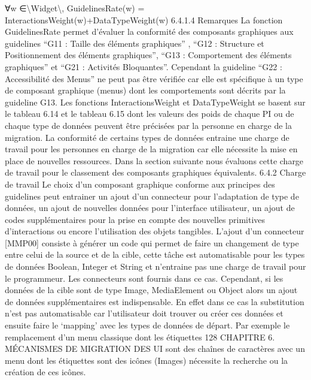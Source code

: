 \documentclass{article}
\begin{document}
∀w ∈\textbackslash{}{Widget\textbackslash{}},
GuidelinesRate(w) = InteractionsWeight(w)+DataTypeWeight(w)
6.4.1.4
Remarques
La fonction GuidelinesRate permet d’\'{e}valuer la conformit\'{e} des composants graphiques aux guidelines “G11 : Taille des \'{e}l\'{e}ments graphiques” , “G12 : Structure et Positionnement des \'{e}l\'{e}ments
graphiques”, “G13 : Comportement des \'{e}l\'{e}ments graphiques” et “G21 : Activit\'{e}s Bloquantes”. Cependant la guideline “G22 : Accessibilit\'{e} des Menus” ne peut pas \^{e}tre v\'{e}riﬁ\'{e}e car elle est sp\'{e}ciﬁque
\`{a} un type de composant graphique (menus) dont les comportements sont d\'{e}crits par la guideline G13.
Les fonctions InteractionsWeight et DataTypeWeight se basent sur le tableau 6.14 et le tableau 6.15 dont les valeurs des poids de chaque PI ou de chaque type de donn\'{e}es peuvent \^{e}tre pr\'{e}cis\'{e}es
par la personne en charge de la migration.
La conformit\'{e} de certains types de donn\'{e}es entraine une charge de travail pour les personnes en
charge de la migration car elle n\'{e}cessite la mise en place de nouvelles ressources. Dans la section
suivante nous \'{e}valuons cette charge de travail pour le classement des composants graphiques \'{e}quivalents.
6.4.2
Charge de travail
Le choix d’un composant graphique conforme aux principes des guidelines peut entrainer un ajout
d’un connecteur pour l’adaptation de type de donn\'{e}es, un ajout de nouvelles donn\'{e}es pour l’interface
utilisateur, un ajout de codes suppl\'{e}mentaires pour la prise en compte des nouvelles primitives d’interactions ou encore l’utilisation des objets tangibles.
L’ajout d’un connecteur [MMP00] consiste \`{a} g\'{e}n\'{e}rer un code qui permet de faire un changement
de type entre celui de la source et de la cible, cette t\^{a}che est automatisable pour les types de donn\'{e}es Boolean, Integer et String et n’entraine pas une charge de travail pour le programmeur. Les
connecteurs sont fournis dans ce cas.
Cependant, si les donn\'{e}es de la cible sont de type Image, MediaElement ou Object alors un
ajout de donn\'{e}es suppl\'{e}mentaires est indispensable. En effet dans ce cas la substitution n’est pas
automatisable car l’utilisateur doit trouver ou cr\'{e}er ces donn\'{e}es et ensuite faire le ‘mapping’ avec les
types de donn\'{e}es de d\'{e}part. Par exemple le remplacement d’un menu classique dont les \'{e}tiquettes
128
CHAPITRE 6. MÉCANISMES DE MIGRATION DES UI
sont des cha\^{i}nes de caract\`{e}res avec un menu dont les \'{e}tiquettes sont des ic\^{o}nes (Images) n\'{e}cessite la
recherche ou la cr\'{e}ation de ces ic\^{o}nes.
\end{document}
